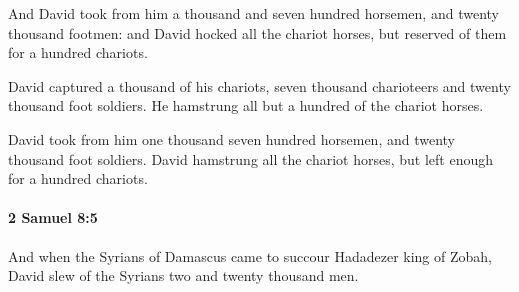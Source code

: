 			\begin{versebox}
					\item[BHS] 
					\item[ASV] And David took from him a thousand and seven hundred horsemen, and twenty thousand footmen: and David hocked all the chariot horses, but reserved of them for a hundred chariots.
					\item[NIV] David captured a thousand of his chariots, seven thousand charioteers and twenty thousand foot soldiers. He hamstrung all but a hundred of the chariot horses.
					\item[NRSV] David took from him one thousand seven hundred horsemen, and twenty thousand foot soldiers. David hamstrung all the chariot horses, but left enough for a hundred chariots.
			\end{versebox}

		\paragraph{2 Samuel 8:5} %
			\label{2SAMUEL-8-5}

			And when the Syrians of Damascus came to succour Hadadezer king of Zobah, David slew of the Syrians two and twenty thousand men.

